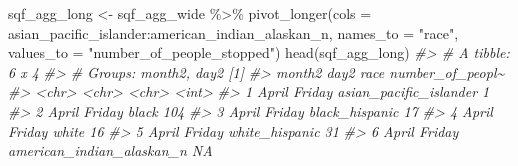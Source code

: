 \documentclass[
]{krantz}
\makeatletter
\newenvironment{Shaded}{\begin{snugshade}}{\end{snugshade}}
\newcommand{\AttributeTok}[1]{\textcolor[rgb]{0.61,0.61,0.61}{#1}}
\newcommand{\CommentTok}[1]{\textcolor[rgb]{0.37,0.37,0.37}{\textit{#1}}}
\newcommand{\FunctionTok}[1]{\textcolor[rgb]{0,0,0}{#1}}
\newcommand{\NormalTok}[1]{#1}
\newcommand{\OtherTok}[1]{\textcolor[rgb]{0.37,0.37,0.37}{#1}}
\newcommand{\SpecialCharTok}[1]{\textcolor[rgb]{0,0,0}{#1}}
\newcommand{\StringTok}[1]{\textcolor[rgb]{0.5,0.5,0.5}{#1}}
\newenvironment{kframe}{%
\medskip{}
\setlength{\fboxsep}{.8em}
 \def\at@end@of@kframe{}%
 \ifinner\ifhmode%
  \def\at@end@of@kframe{\end{minipage}}%
  \begin{minipage}{\columnwidth}%
 \fi\fi%
 \def\FrameCommand##1{\hskip\@totalleftmargin \hskip-\fboxsep
 \colorbox{shadecolor}{##1}\hskip-\fboxsep
     \hskip-\linewidth \hskip-\@totalleftmargin \hskip\columnwidth}%
 \MakeFramed {\advance\hsize-\width
   \@totalleftmargin\z@ \linewidth\hsize
   \@setminipage}}%
 {\par\unskip\endMakeFramed%
 \at@end@of@kframe}
\renewenvironment{Shaded}{\begin{kframe}}{\end{kframe}}
\makeatother
\begin{document}
\begin{Shaded}
\begin{Highlighting}[]
\NormalTok{sqf\_agg\_long }\OtherTok{\textless{}{-}}\NormalTok{ sqf\_agg\_wide }\SpecialCharTok{\%\textgreater{}\%}
  \FunctionTok{pivot\_longer}\NormalTok{(}\AttributeTok{cols =}\NormalTok{ asian\_pacific\_islander}\SpecialCharTok{:}\NormalTok{american\_indian\_alaskan\_n,}
               \AttributeTok{names\_to =} \StringTok{"race"}\NormalTok{,}
               \AttributeTok{values\_to =} \StringTok{"number\_of\_people\_stopped"}\NormalTok{)}
\FunctionTok{head}\NormalTok{(sqf\_agg\_long)}
\CommentTok{\#\textgreater{} \# A tibble: 6 x 4}
\CommentTok{\#\textgreater{} \# Groups:   month2, day2 [1]}
\CommentTok{\#\textgreater{}   month2 day2   race                      number\_of\_peopl\textasciitilde{}}
\CommentTok{\#\textgreater{}   \textless{}chr\textgreater{}  \textless{}chr\textgreater{}  \textless{}chr\textgreater{}                                \textless{}int\textgreater{}}
\CommentTok{\#\textgreater{} 1 April  Friday asian\_pacific\_islander                   1}
\CommentTok{\#\textgreater{} 2 April  Friday black                                  104}
\CommentTok{\#\textgreater{} 3 April  Friday black\_hispanic                          17}
\CommentTok{\#\textgreater{} 4 April  Friday white                                   16}
\CommentTok{\#\textgreater{} 5 April  Friday white\_hispanic                          31}
\CommentTok{\#\textgreater{} 6 April  Friday american\_indian\_alaskan\_n               NA}
\end{Highlighting}
\end{Shaded}
\end{document}
